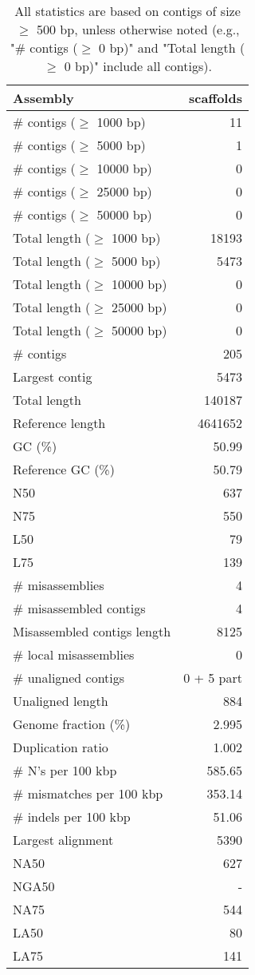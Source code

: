 \documentclass[12pt,a4paper]{article}
\begin{document}
\begin{table}[ht]
\begin{center}
\caption{All statistics are based on contigs of size $\geq$ 500 bp, unless otherwise noted (e.g., "\# contigs ($\geq$ 0 bp)" and "Total length ($\geq$ 0 bp)" include all contigs).}
\begin{tabular}{|l*{1}{|r}|}
\hline
Assembly & scaffolds \\ \hline
\# contigs ($\geq$ 1000 bp) & 11 \\ \hline
\# contigs ($\geq$ 5000 bp) & 1 \\ \hline
\# contigs ($\geq$ 10000 bp) & 0 \\ \hline
\# contigs ($\geq$ 25000 bp) & 0 \\ \hline
\# contigs ($\geq$ 50000 bp) & 0 \\ \hline
Total length ($\geq$ 1000 bp) & 18193 \\ \hline
Total length ($\geq$ 5000 bp) & 5473 \\ \hline
Total length ($\geq$ 10000 bp) & 0 \\ \hline
Total length ($\geq$ 25000 bp) & 0 \\ \hline
Total length ($\geq$ 50000 bp) & 0 \\ \hline
\# contigs & 205 \\ \hline
Largest contig & 5473 \\ \hline
Total length & 140187 \\ \hline
Reference length & 4641652 \\ \hline
GC (\%) & 50.99 \\ \hline
Reference GC (\%) & 50.79 \\ \hline
N50 & 637 \\ \hline
N75 & 550 \\ \hline
L50 & 79 \\ \hline
L75 & 139 \\ \hline
\# misassemblies & 4 \\ \hline
\# misassembled contigs & 4 \\ \hline
Misassembled contigs length & 8125 \\ \hline
\# local misassemblies & 0 \\ \hline
\# unaligned contigs & 0 + 5 part \\ \hline
Unaligned length & 884 \\ \hline
Genome fraction (\%) & 2.995 \\ \hline
Duplication ratio & 1.002 \\ \hline
\# N's per 100 kbp & 585.65 \\ \hline
\# mismatches per 100 kbp & 353.14 \\ \hline
\# indels per 100 kbp & 51.06 \\ \hline
Largest alignment & 5390 \\ \hline
NA50 & 627 \\ \hline
NGA50 & - \\ \hline
NA75 & 544 \\ \hline
LA50 & 80 \\ \hline
LA75 & 141 \\ \hline
\end{tabular}
\end{center}
\end{table}
\end{document}
